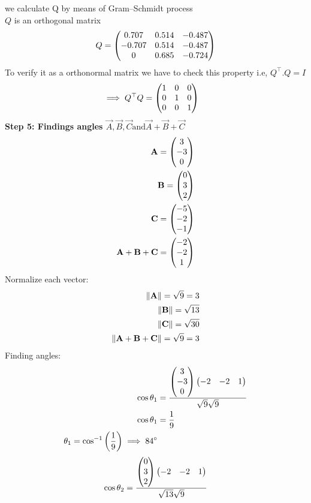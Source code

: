 \documentclass[11pt]{book}
\begin{document}
\begin{enumerate}
we calculate Q by means of Gram–Schmidt process\\
$Q$ is an orthogonal matrix 
\begin{align*}
    Q=\begin{pmatrix} 0.707&0.514&-0.487\\-0.707&0.514&-0.487\\0&0.685&-0.724\end{pmatrix}
\end{align*}
To verify it as a orthonormal matrix we have to check this property i.e,  $Q^{\top}.Q =I$
\begin{align*}
    \implies Q^\top Q &= \begin{pmatrix}1&0&0\\0&1&0\\0&0&1\end{pmatrix}
\end{align*}
\textbf{Step 5: Findings angles $\vec{A},\vec{B},\vec{C} \text{and} \vec{A}+\vec{B}+\vec{C} $}
\begin{align}
    \mathbf{A}=\begin{pmatrix}3 \\-3 \\0\end{pmatrix}\\
    \mathbf{B}=\begin{pmatrix}0\\ 3\\ 2\end{pmatrix}  \\
    \mathbf{C}=\begin{pmatrix}-5\\-2\\ -1\end{pmatrix}\\
    \mathbf{A}+\mathbf{B}+\mathbf{C}=\begin{pmatrix}-2\\-2\\ 1\end{pmatrix}
\end{align}
Normalize each vector:\\
   \begin{align}
    \left\lVert\mathbf{A}\right\rVert=\sqrt{9}=3\\
    \left\lVert\mathbf{B}\right\rVert=\sqrt{13}\\
     \left\lVert\mathbf{C}\right\rVert=\sqrt{30}\\
     \left\lVert\mathbf{A}+\mathbf{B}+\mathbf{C}\right\rVert=\sqrt{9}=3
   \end{align}
Finding angles:
\begin{align}
    \cos{\theta_1}&=\frac{\begin{pmatrix}3 \\-3 \\0\end{pmatrix}\begin{pmatrix}-2&-2&1\end{pmatrix}}{\sqrt{9}\sqrt{9}}\\
    \cos{\theta_1}&=\frac{1}{9}\\
    \theta_1=\cos^{-1}\left(\frac{1}{9}\right)
    \implies 84\degree
\end{align}
\begin{align}
    \cos{\theta_2}&=\frac{\myvec{0 \\3 \\2}\myvec{-2&-2&1}}{\sqrt{13}\sqrt{9}}\\

\end{align}
\end{enumerate}
\end{document}
